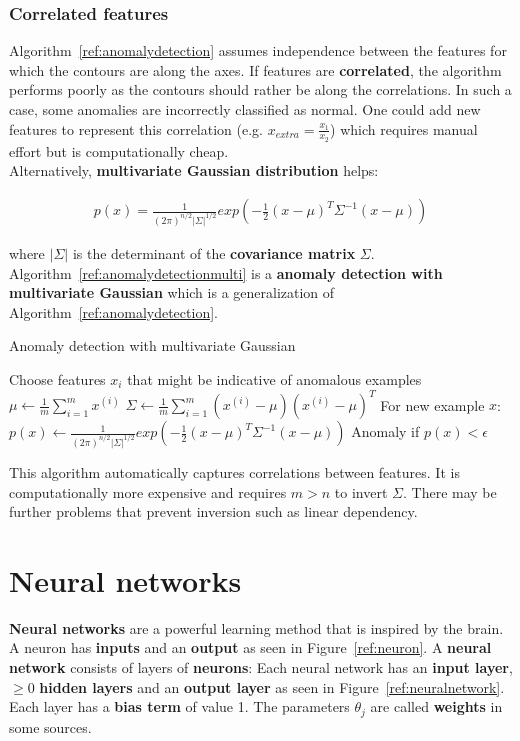 \documentclass{report}
\begin{document}
\subsection{Correlated features}
Algorithm~\ref{ref:anomalydetection} assumes independence between the features for which the contours are along the axes. If features are {\bf correlated}, the algorithm performs poorly as the contours should rather be along the correlations. In such a case, some anomalies are incorrectly classified as normal. One could add new features to represent this correlation (e.g. $x_{extra}=\frac{x_1}{x_2}$) which requires manual effort but is computationally cheap. \\

Alternatively, {\bf multivariate Gaussian distribution} helps:

\begin{align*}
p(x)=\frac{1}{(2\pi)^{n/2}\vert \Sigma \vert ^{1/2}}exp(-\frac{1}{2}(x-\mu)^T \Sigma^{-1}(x-\mu))
\end{align*}

where $\vert \Sigma \vert$ is the determinant of the {\bf covariance matrix} $\Sigma$. Algorithm~\ref{ref:anomalydetectionmulti} is a {\bf anomaly detection with multivariate Gaussian} which is a generalization of Algorithm~\ref{ref:anomalydetection}.

\begin{algorithm}
\caption{Anomaly detection with multivariate Gaussian}
\label{ref:anomalydetectionmulti}
\begin{algorithmic}
\State Choose features $x_i$ that might be indicative of anomalous examples
\State $\mu \gets \frac{1}{m}\sum_{i=1}^m x^{(i)}$
\State $\Sigma \gets \frac{1}{m}\sum_{i=1}^m(x^{(i)}-\mu)(x^{(i)}-\mu)^T$
\State For new example $x$: $p(x) \gets \frac{1}{(2\pi)^{n/2}\vert \Sigma \vert ^{1/2}}exp(-\frac{1}{2}(x-\mu)^T \Sigma^{-1}(x-\mu))$ 
\State Anomaly if $p(x) < \epsilon$
\end{algorithmic}
\end{algorithm}

This algorithm automatically captures correlations between features. It is computationally more expensive and requires $m>n$ to invert $\Sigma$. There may be further problems that prevent inversion such as linear dependency.


\chapter{Neural networks}
\label{chapter:neuralnetworks}
{\bf Neural networks} are a powerful learning method that is inspired by the brain.
A neuron has {\bf inputs} and an {\bf output} as seen in Figure~\ref{ref:neuron}.
A {\bf neural network} consists of layers of {\bf neurons}:
Each neural network has an {\bf input layer}, $\ge 0$ {\bf hidden layers} and an {\bf output layer} as seen in Figure~\ref{ref:neuralnetwork}.
Each layer has a {\bf bias term} of value 1. The parameters $\theta_j$ are called {\bf weights} in some sources.
\end{document}
